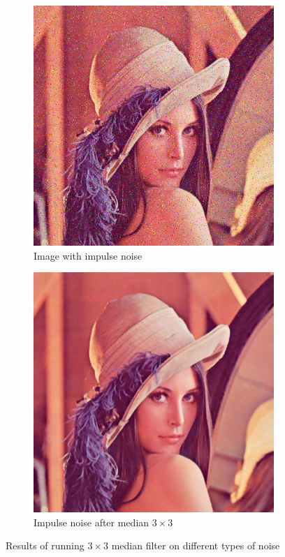 \documentclass[12pt]{article}
\theoremstyle{definition}
\begin{document}
\begin{figure}[ht]
\begin{subfigure}[t]{.4\textwidth}
        \includegraphics[width=.8\textwidth]{lenac_impulse3}
        \caption{Image with impulse noise}
    \end{subfigure}
    \begin{subfigure}[t]{.4\textwidth}\centering
        \includegraphics[width=.8\textwidth]{lenac_impulse_median}
        \caption{Impulse noise after median $3\times3$}
    \end{subfigure}
    \caption{Results of running $3\times3$ median filter on different types of noise}
\end{figure}
\end{document}

